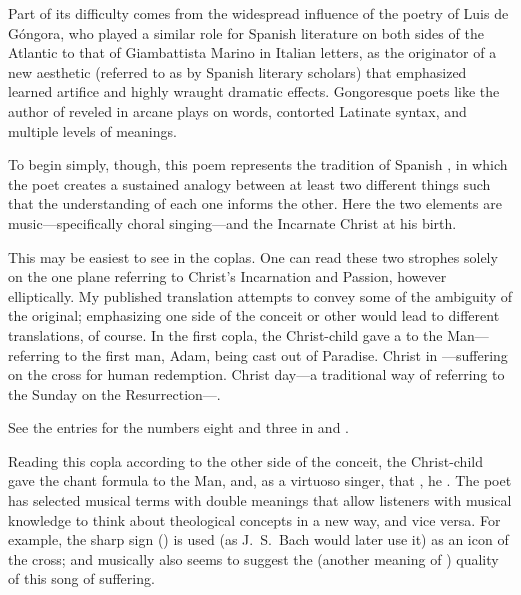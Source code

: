 Part of its difficulty comes from the widespread influence of the poetry of Luis
de Góngora, who played a similar role for Spanish literature on both sides of
the Atlantic to that of Giambattista Marino in Italian letters, as the
originator of a new aesthetic (referred to as  by Spanish literary
scholars) that emphasized learned artifice and highly wraught dramatic effects.
Gongoresque poets like the author of  reveled in arcane plays
on words, contorted Latinate syntax, and multiple levels of meanings.%
    \Autocites
    [222--237]{Gaylord:Poetry}
    {Tenorio:Gongorismo}
    [vol.\ 1, 1014--1061]{Valbuena:Literatura}

To begin simply, though, this poem represents the tradition of Spanish
, in which the poet creates a sustained analogy between at
least two different things such that the understanding of each one informs the
other.
Here the two elements are music---specifically choral singing---and the
Incarnate Christ at his birth.

This may be easiest to see in the coplas.
One can read these two strophes solely on the one plane referring to Christ's
Incarnation and Passion, however elliptically.
My published translation attempts to convey some of the ambiguity of the
original; emphasizing one side of the conceit or other would lead to different
translations, of course.
In the first copla, the Christ-child gave a  to the
Man---referring to the first man, Adam, being cast out of Paradise.
Christ  in ---suffering on the cross for human redemption.
Christ  day---a traditional way of referring to the
Sunday on the Resurrection---.%
    \begin{Footnote}
        See the entries for the numbers eight and three in
        \autocite{Bongo:NumerorumMysteria} and
        \autocite{Ricciardo:CommentariaSymbolica}.
    \end{Footnote}

Reading this copla according to the other side of the conceit, the Christ-child
gave the  chant formula to the Man, and, as a virtuoso
singer,  that , he
.
The poet has selected musical terms with double meanings that allow listeners
with musical knowledge to think about theological concepts in a new way, and
vice versa.
For example, the sharp sign () is used (as J.\ S.\ Bach would
later use it) as an icon of the cross; and musically also seems to suggest the
 (another meaning of ) quality of this song
of suffering.

